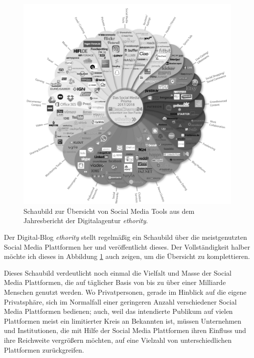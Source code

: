 \begin{figure}[h]
    \centering
    \includegraphics[width=\textwidth]{img/ethority-smp-bw.png}
    \caption{Schaubild zur Übersicht von Social Media Tools aus dem Jahresbericht der Digitalagentur \textit{ethority}. \\ \cite{ethorityprisma2018}}
    \label{fig:socialmediatoolsethority}
\end{figure}

Der Digital-Blog \textit{ethority} stellt regelmäßig ein Schaubild über die meistgenutzten Social Media Plattformen her und veröffentlicht dieses. Der Vollständigkeit halber möchte ich dieses in Abbildung \ref{fig:socialmediatoolsethority} auch zeigen, um die Übersicht zu komplettieren.



Dieses Schaubild verdeutlicht noch einmal die Vielfalt und Masse der Social Media Plattformen, die auf täglicher Basis von bis zu über einer Milliarde Menschen genutzt werden. Wo Privatpersonen, gerade im Hinblick auf die eigene Privatsphäre, sich im Normalfall einer geringeren Anzahl verschiedener Social Media Plattformen bedienen; auch, weil das intendierte Publikum auf vielen Plattformen meist ein limitierter Kreis an Bekannten ist, müssen Unternehmen und Institutionen, die mit Hilfe der Social Media Plattformen ihren Einfluss und ihre Reichweite vergrößern möchten, auf eine Vielzahl von unterschiedlichen Plattformen zurückgreifen.

